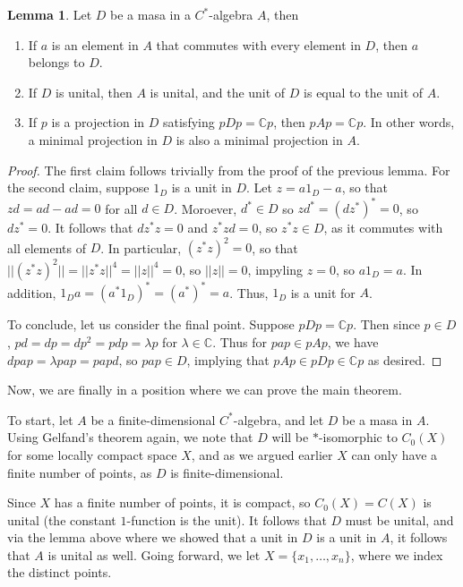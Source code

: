 \documentclass[aps,pra,showpacs,notitlepage,onecolumn,superscriptaddress,nofootinbib]{revtex4-1}
\theoremstyle{definition}
\newtheorem{lemma}{Lemma}[section]
\begin{document}
\begin{lemma}
  Let $D$ be a masa in a $C^{*}$-algebra $A$, then
  \begin{enumerate}
  \item If $a$ is an element in $A$ that commutes with every element in $D$, then $a$ belongs to $D$.
  \item If $D$ is unital, then $A$ is unital, and the unit of $D$ is equal to the unit of $A$.
  \item If $p$ is a projection in $D$ satisfying $pDp = \mathbb{C}p$, then $pAp = \mathbb{C}p$. In other words,
    a minimal projection in $D$ is also a minimal projection in $A$.
  \end{enumerate}
\end{lemma}
\begin{proof}
  The first claim follows trivially from the proof of the previous lemma. For the second claim, suppose $1_D$ is a unit in $D$.
  Let $z = a 1_D - a$, so that $zd = ad - ad = 0$ for all $d \in D$. Moroever, $d^{*} \in D$ so $z d^{*} = (d z^{*})^{*} = 0$, so $d z^{*} = 0$.
  It follows that $d z^{*} z = 0$ and $z^{*} z d = 0$, so $z^{*} z \in D$, as it commutes with all elements of $D$. In particular, $(z^{*} z)^{2} = 0$,
  so that $||(z^{*} z)^{2}|| = ||z^{*} z||^4 = ||z||^4 = 0$, so $||z|| = 0$, impyling $z = 0$, so $a 1_D = a$. In addition, $1_D a = (a^{*} 1_D)^{*} = (a^{*})^{*} = a$.
  Thus, $1_D$ is a unit for $A$.

  To conclude, let us consider the final point. Suppose $pDp = \mathbb{C} p$. Then since $p \in D$, $pd = dp = dp^2 = pdp = \lambda p$ for $\lambda \in \mathbb{C}$. Thus for $pap \in pAp$,
  we have $dpap = \lambda pap = papd$, so $pap \in D$, implying that $pAp \in pDp \in \mathbb{C} p$ as desired.
\end{proof}

\noindent Now, we are finally in a position where we can prove the main theorem.
\newline

\noindent To start, let $A$ be a finite-dimensional $C^{*}$-algebra, and let $D$ be a masa in $A$. Using Gelfand's theorem again, we note that
$D$ will be $*$-isomorphic to $C_0(X)$ for some locally compact space $X$, and as we argued earlier $X$ can only have a finite number of points,
as $D$ is finite-dimensional.

Since $X$ has a finite number of points, it is compact, so $C_0(X) = C(X)$ is unital (the constant $1$-function is the unit). It follows that $D$ must
be unital, and via the lemma above where we showed that a unit in $D$ is a unit in $A$, it follows that $A$ is unital as well. Going forward, we
let $X = \{x_1, \dots, x_n\}$, where we index the distinct points.
\end{document}
